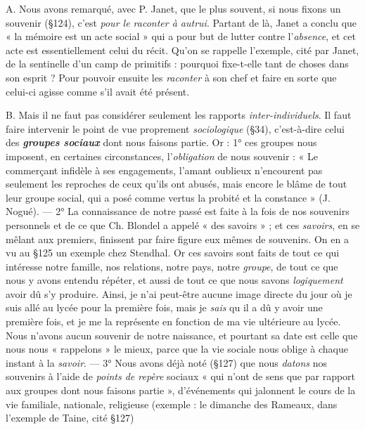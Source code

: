 A. Nous avons remarqué, avec P. Janet, que le plus souvent, si
nous fixons un souvenir (\S 124), c’est {\it pour le raconter à autrui}. Partant
de là, Janet a conclu que « la mémoire est un acte social »
qui a pour but de lutter contre l'{\it absence}, et cet acte est essentiellement
celui du récit. Qu’on se rappelle l’exemple, cité par Janet,
de la sentinelle d’un camp de primitifs : pourquoi fixe-t-elle tant
de choses dans son esprit ? Pour pouvoir ensuite les {\it raconter} à
son chef et faire en sorte que celui-ci agisse comme s’il avait été
présent.

B. Mais il ne faut pas considérer seulement les rapports {\it inter-individuels}.
Il faut faire intervenir le point de vue proprement {\it sociologique}
(\S 34), c’est-à-dire celui des \textbf{\textit {groupes sociaux}} dont nous faisons
partie. Or : 1° ces groupes nous imposent, en certaines circonstances,
l'{\it obligation} de nous souvenir : « Le commerçant infidèle à ses engagements,
l’amant oublieux n’encourent pas seulement les reproches
de ceux qu’ils ont abusés, mais encore le blâme de tout leur groupe
social, qui a posé comme vertus la probité et la constance » (J. Nogué).
— 2° La connaissance de notre passé est faite à la fois de nos souvenirs
personnels et de ce que Ch. Blondel a appelé « des savoirs » ; et ces
{\it savoirs}, en se mêlant aux premiers, finissent par faire figure eux mêmes
de souvenirs. On en a vu au \S 125 un exemple chez Stendhal.
Or ces savoirs sont faits de tout ce qui intéresse notre famille, nos
relations, notre pays, notre {\it groupe}, de tout ce que nous y avons
entendu répéter, et aussi de tout ce que nous savons {\it logiquement} avoir
dû s’y produire. Ainsi, je n’ai peut-être aucune image directe du jour où
je suis allé au lycée pour la première fois, mais je {\it sais} qu il a dû y
avoir une première fois, et je me la représente en fonction de ma vie
ultérieure au lycée. Nous n’avons aucun souvenir de notre naissance,
et pourtant sa date est celle que nous nous « rappelons » le mieux,
parce que la vie sociale nous oblige à chaque instant à la {\it savoir}. —
3° Nous avons déjà noté (\S 127) que nous {\it datons} nos souvenirs à
l’aide de {\it points de repère} sociaux « qui n’ont de sens que par rapport
aux groupes dont nous faisons partie », d'événements qui jalonnent
le cours de la vie familiale, nationale, religieuse (exemple : le dimanche
des Rameaux, dans l’exemple de Taine, cité \S 127)


